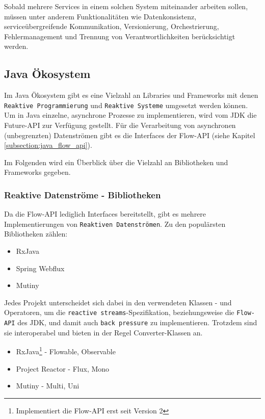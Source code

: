 Sobald mehrere Services in einem solchen System miteinander arbeiten sollen, müssen unter anderem Funktionalitäten wie
Datenkonsistenz, serviceübergreifende Kommunikation, Versionierung, Orchestrierung, Fehlermanagement und Trennung von Verantwortlichkeiten
berücksichtigt werden.

\subsection{Java Ökosystem}
\label{subsec:java_ökosystem}
Im Java Ökosystem gibt es eine Vielzahl an Libraries und Frameworks mit denen
\verb|Reaktive Programmierung| und \verb|Reaktive Systeme| umgesetzt werden können.
Um in Java einzelne, asynchrone Prozesse zu implementieren, wird vom JDK die Future-API zur Verfügung gestellt.\parencite{OracleFuture}
Für die Verarbeitung von asynchronen (unbegrenzten) Datenströmen gibt es die Interfaces der Flow-API (siehe Kapitel \ref{subsection:java_flow_api}).
\parencite{OracleFlow}

Im Folgenden wird ein Überblick über die Vielzahl an Bibliotheken und Frameworks gegeben.
\subsubsection{Reaktive Datenströme - Bibliotheken}
\label{subsubsec:reactive_streams}
Da die Flow-API lediglich Interfaces bereitstellt, gibt es mehrere Implementierungen von \verb|Reaktiven Datenströmen|.
Zu den populärsten Bibliotheken zählen:
\begin{itemize}
  \item RxJava
  \item Spring Webflux
  \item Mutiny
\end{itemize}
Jedes Projekt unterscheidet sich dabei in den verwendeten Klassen - und Operatoren, um die \verb|reactive streams|-Spezifikation,
beziehungsweise die \verb|Flow-API| des JDK, und damit auch \verb|back pressure| zu implementieren.
Trotzdem sind sie interoperabel und bieten in der Regel Converter-Klassen an.
\begin{itemize}
  \item RxJava\footnote{Implementiert die Flow-API erst seit Version 2} - Flowable, Observable \parencite{RxJava}
  \item Project Reactor - Flux, Mono \parencite{ProjectReactor}
  \item Mutiny - Multi, Uni \parencite{Mutiny}
\end{itemize}

